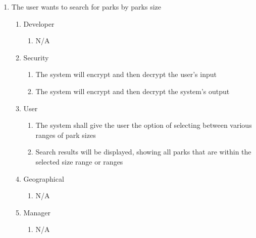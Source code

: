 \documentclass[titlepage]{article}
\begin{document}
\begin{enumerate}[{BE}1.]
    \item The user wants to search for parks by parks size
    \begin{enumerate}[{VP\theenumi}.1]
        \item Developer
            \begin{enumerate}
                \item N/A
            \end{enumerate}
        \item Security
            \begin{enumerate}
                \item The system will encrypt and then decrypt the user's input
                \item The system will encrypt and then decrypt the system's output
            \end{enumerate}
        \item User
            \begin{enumerate}
                \item The system shall give the user the option of selecting between various ranges
                of park sizes
                \item Search results will be displayed, showing all parks that are within the
                selected size range or ranges
            \end{enumerate}
        \item Geographical
            \begin{enumerate}
                \item N/A
            \end{enumerate}
        \item Manager
            \begin{enumerate}
                \item N/A
            \end{enumerate}
    \end{enumerate}


\end{enumerate}
\end{document}
